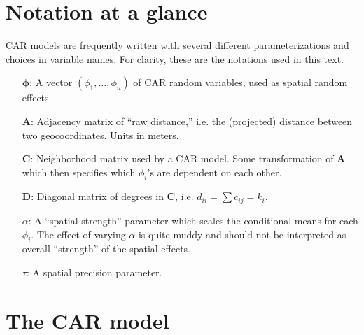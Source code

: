\documentclass{scrartcl}
\newcommand{\mat}[1]{\bm{#1}}
\begin{document}
\section{Notation at a glance}

CAR models are frequently written with several different
parameterizations and choices in variable names. For clarity, these
are the notations used in this text.

\begin{itemize}
\item [$\mat{\phi}$:] A vector $(\phi_1,\dots, \phi_n)$ of CAR random
  variables, used as spatial random effects.
\item [$\mat{A}$:] Adjacency matrix of ``raw distance,'' i.e. the
  (projected) distance between two geocoordinates. Units in meters.
\item [$\mat{C}$:] Neighborhood matrix used by a CAR model. Some
  transformation of $\mat{A}$ which then specifies which $\phi_i$'s
  are dependent on each other.
\item [$\mat{D}$:] Diagonal matrix of degrees in $\mat{C}$,
  i.e. $d_{ii} = \sum{c_{ij}} = k_i$.
\item [$\alpha$:] A ``spatial strength'' parameter which scales the
  conditional means for each $\phi_i$. The effect of varying $\alpha$
  is quite muddy and should not be interpreted as overall ``strength''
  of the spatial effects.
\item [$\tau$:] A spatial precision parameter. 
\end{itemize}



\section{The CAR model}
\label{sec:car-model}
\end{document}

